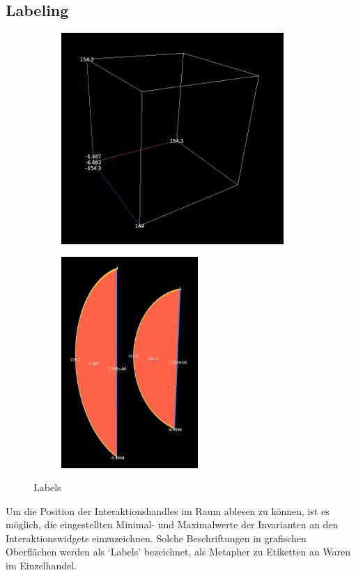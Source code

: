 \documentclass[a4paper,fontsize=12pt,toc=bib,halfparskip,ngerman]{scrartcl}
\begin{document}
\subsection{Labeling}
\begin{figure}
	\centering
	\begin{subfigure}{0.4\textwidth}
		\centering
		\includegraphics[height=8cm]{pictures/QuadricLabels.png}
		\subcaption{}
		\label{QuadricLabels}
	\end{subfigure}
	\hspace{2cm}
	\begin{subfigure}{0.4\textwidth}
		\centering
		\includegraphics[height=8cm]{pictures/CylindricalLabels.png}
		\subcaption{}
		\label{CylindricalLabels}
	\end{subfigure}
	\caption{Labels}
\end{figure}
Um die Position der Interaktionshandles im Raum ablesen zu k\"onnen, ist es m\"oglich, die eingestellten Minimal- und Maximalwerte der Invarianten an den Interaktionswidgets einzuzeichnen. Solche Beschriftungen in grafischen Oberfl\"achen werden als `Labels' bezeichnet, als Metapher zu Etiketten an Waren im Einzelhandel.
\end{document}
